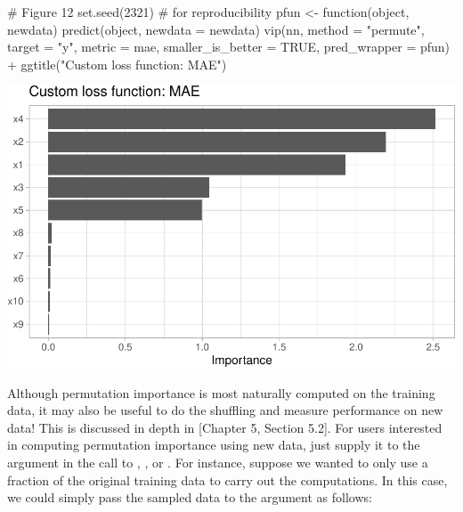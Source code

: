 \begin{Schunk}
\begin{Sinput}
# Figure 12
set.seed(2321)  # for reproducibility
pfun <- function(object, newdata)  predict(object, newdata = newdata)
vip(nn, method = "permute", target = "y", metric = mae,
    smaller_is_better = TRUE, pred_wrapper = pfun) +
  ggtitle("Custom loss function: MAE")
\end{Sinput}


\begin{center}\includegraphics[width=0.7\linewidth]{greenwell-boehmke_files/figure-latex/vip-nn-mae-1} \end{center}

\end{Schunk}

Although permutation importance is most naturally computed on the
training data, it may also be useful to do the shuffling and measure
performance on new data! This is discussed in depth in
\citet{molnar-2019-iml}{[}Chapter 5, Section 5.2{]}. For users
interested in computing permutation importance using new data, just
supply it to the  argument in the call to ,
, or . For instance, suppose we wanted
to only use a fraction of the original training data to carry out the
computations. In this case, we could simply pass the sampled data to the
 argument as follows:

